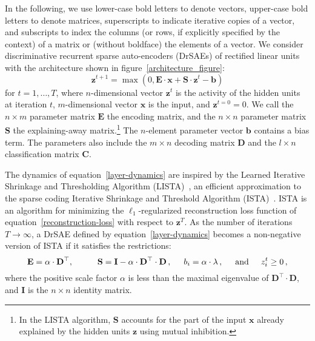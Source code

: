 \documentclass{article} %
\newcommand{\bv}{\mathbf{b}}
\newcommand{\hid}{\mathbf{z}}
\newcommand{\nobfhid}{z}
\newcommand{\inp}{\mathbf{x}}
\newcommand{\C}{\mathbf{C}}
\newcommand{\D}{\mathbf{D}}
\newcommand{\E}{\mathbf{E}}
\newcommand{\I}{\mathbf{I}}
\newcommand{\Sm}{\mathbf{S}}
\begin{document}
In the following, we use lower-case bold letters to denote vectors, upper-case bold letters to denote matrices, superscripts to indicate iterative copies of a vector, and subscripts to index the columns (or rows, if explicitly specified by the context) of a matrix or (without boldface) the elements of a vector.
We consider discriminative recurrent sparse auto-encoders (DrSAEs) of rectified linear units with the architecture shown in figure~\ref{architecture_figure}: %
\begin{equation} \label{layer-dynamics}
\hid^{t+1} = \max\left(0, \E \cdot \inp + \Sm \cdot \hid^t - \bv \right)
\end{equation}
for $t = 1, \ldots, T$, where $n$-dimensional vector $\hid^t$ is the activity of the hidden units at iteration $t$, %
$m$-dimensional vector $\inp$ is the input, and $\hid^{t=0} = 0$.  We call the $n \times m$ parameter matrix $\E$ the encoding matrix, and the $n \times n$ parameter matrix $\Sm$ the explaining-away matrix.\footnote{In the LISTA algorithm, $\Sm$ accounts for the part of the input $\inp$ already explained by the hidden units $\hid$ using mutual inhibition.}  The $n$-element parameter vector $\bv$ contains a bias term.  The parameters also include the $m \times n$ decoding matrix $\D$ and the $l \times n$ classification matrix $\C$.

The dynamics of equation~\ref{layer-dynamics} are inspired by the Learned Iterative Shrinkage and Thresholding Algorithm (LISTA)~\citep{gregor2010}, an efficient approximation to the sparse coding Iterative Shrinkage and Threshold Algorithm (ISTA)~\citep{chambolle1998, daubechies2004}.
ISTA is an %
algorithm for minimizing the $\ell_1$-regularized reconstruction loss function of equation~\ref{reconstruction-loss} %
with respect to $\hid^T$. %
As the number of iterations $T \rightarrow \infty$, a DrSAE defined by equation~\ref{layer-dynamics} becomes a non-negative version of ISTA if it satisfies the restrictions:
\begin{equation} \label{ISTA-restriction}
\E = \alpha \cdot \D^{\top} , \hspace{1cm}
\Sm = \I - \alpha \cdot \D^{\top} \cdot \D \, , \hspace{0.5cm}
b_i= \alpha \cdot \lambda \, , \hspace{0.5cm} %
\text{and} \hspace{0.5cm} \nobfhid_i^t \geq 0 \, ,
\end{equation}
where the positive scale factor $\alpha$ is less than the maximal eigenvalue of $\D^{\top} \cdot \D$, and $\I$ is the $n \times n$ identity matrix.
\end{document}
